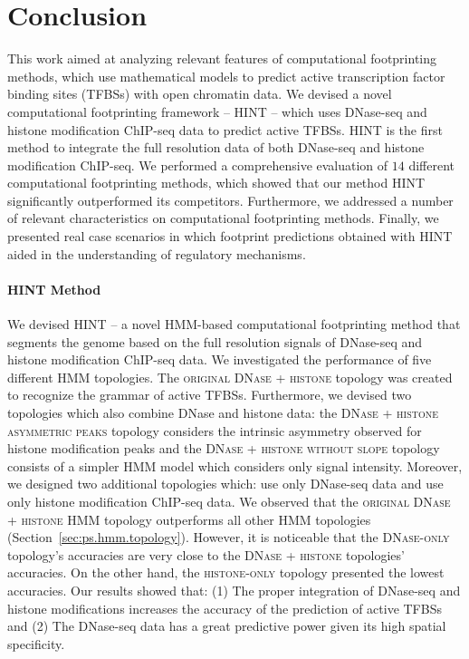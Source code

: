\chapter{Conclusion}
\label{cha:conclusion}

\graphicspath{{chapter6/figs/}}

This work aimed at analyzing relevant features of computational footprinting methods, which use mathematical models to predict active transcription factor binding sites (TFBSs) with open chromatin data. We devised a novel computational footprinting framework -- HINT -- which uses DNase-seq and histone modification ChIP-seq data to predict active TFBSs. HINT is the first method to integrate the full resolution data of both DNase-seq and histone modification ChIP-seq. We performed a comprehensive evaluation of $14$ different computational footprinting methods, which showed that our method HINT significantly outperformed its competitors. Furthermore, we addressed a number of relevant characteristics on computational footprinting methods. Finally, we presented real case scenarios in which footprint predictions obtained with HINT aided in the understanding of regulatory mechanisms.

\subsubsection{HINT Method}

We devised HINT -- a novel HMM-based computational footprinting method that segments the genome based on the full resolution signals of DNase-seq and histone modification ChIP-seq data. We investigated the performance of five different HMM topologies. The \textsc{original DNase + histone} topology was created to recognize the grammar of active TFBSs. Furthermore, we devised two topologies which also combine DNase and histone data: the \textsc{DNase + histone asymmetric peaks} topology considers the intrinsic asymmetry observed for histone modification peaks and the \textsc{DNase + histone without slope} topology consists of a simpler HMM model which considers only signal intensity. Moreover, we designed two additional topologies which: use only DNase-seq data and use only histone modification ChIP-seq data. We observed that the \textsc{original DNase + histone} HMM topology outperforms all other HMM topologies (Section~\ref{sec:ps.hmm.topology}). However, it is noticeable that the \textsc{DNase-only} topology's accuracies are very close to the \textsc{DNase + histone} topologies' accuracies. On the other hand, the \textsc{histone-only} topology presented the lowest accuracies. Our results showed that: (1) The proper integration of DNase-seq and histone modifications increases the accuracy of the prediction of active TFBSs and (2) The DNase-seq data has a great predictive power given its high spatial specificity.

